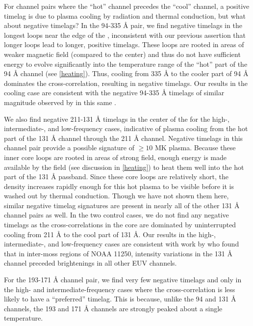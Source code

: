 For channel pairs where the ``hot'' channel precedes the ``cool'' channel, a positive timelag is due to plasma cooling by radiation and thermal conduction, but what about negative timelags? In the 94-335 \AA{} pair, we find negative timelags in the longest loops near the edge of the \AR{}, inconsistent with our previous assertion that longer loops lead to longer, positive timelags. These loops are rooted in areas of weaker magnetic field (compared to the center) and thus do not have sufficient energy to evolve significantly into the temperature range of the ``hot'' part of the 94 \AA{} channel (see \autoref{heating}). Thus, cooling from 335 \AA{} to the cooler part of 94 \AA{} dominates the cross-correlation, resulting in negative timelags. Our results in the cooling case are consistent with the negative 94-335 \AA{} timelags of similar magnitude observed by \citet{viall_survey_2017} in this same \AR{}.

We also find negative 211-131 \AA{} timelags in the center of the \AR{} for the high-, intermediate-, and low-frequency cases, indicative of plasma cooling from the hot part of the 131 \AA{} channel through the 211 \AA{} channel. Negative timelags in this channel pair provide a possible signature of $\ge10$ MK plasma. Because these inner core loops are rooted in areas of strong field, enough energy is made available by the field (see discussion in \autoref{heating}) to heat them well into the hot part of the 131 \AA{} passband. Since these core loops are relatively short, the density increases rapidly enough for this hot plasma to be visible before it is washed out by thermal conduction. Though we have not shown them here, similar negative timelag signatures are present in nearly all of the other 131 \AA{} channel pairs as well. In the two control cases, we do not find any negative timelags as the cross-correlations in the core are dominated by uninterrupted cooling from 211 \AA{} to the cool part of 131 \AA{}. Our results in the high-, intermediate-, and low-frequency cases are consistent with work by \citet{cadavid_heating_2014} who found that in inter-moss regions of \AR{} NOAA 11250, intensity variations in the 131 \AA{} channel preceded brightenings in all other EUV channels. 

For the 193-171 \AA{} channel pair, we find very few negative timelags and only in the high- and intermediate-frequency cases where the cross-correlation is less likely to have a ``preferred'' timelag. This is because, unlike the 94 and 131 \AA{} channels, the 193 and 171 \AA{} channels are strongly peaked about a single temperature.

